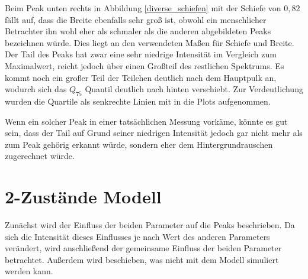 Beim Peak unten rechts in Abbildung \ref{diverse_schiefen} mit der Schiefe von $0,82$ fällt auf, dass die Breite ebenfalls sehr groß ist, obwohl ein menschlicher Betrachter ihn wohl eher als schmaler als die anderen abgebildeten Peaks bezeichnen würde. Dies liegt an den verwendeten Maßen für Schiefe und Breite. Der Tail des Peaks hat zwar eine sehr niedrige Intensität im Vergleich zum Maximalwert, reicht jedoch über einen Großteil des restlichen Spektrums. Es kommt noch ein großer Teil der Teilchen deutlich nach dem Hauptpulk an, wodurch sich das $Q_{75}$ Quantil deutlich nach hinten verschiebt. Zur Verdeutlichung wurden die Quartile als senkrechte Linien mit in die Plots aufgenommen.

Wenn ein solcher Peak in einer tatsächlichen Messung vorkäme, könnte es gut sein, dass der Tail auf Grund seiner niedrigen Intensität jedoch gar nicht mehr als zum Peak gehörig erkannt würde, sondern eher dem Hintergrundrauschen zugerechnet würde.


\section{2-Zustände Modell} 
Zunächst wird der Einfluss der beiden Parameter auf die Peaks beschrieben. Da sich die Intensität dieses Einflusses je nach Wert des anderen Parameters verändert, wird anschließend der gemeinsame Einfluss der beiden Parameter betrachtet. Außerdem wird beschieben, was nicht mit dem Modell simuliert werden kann.

